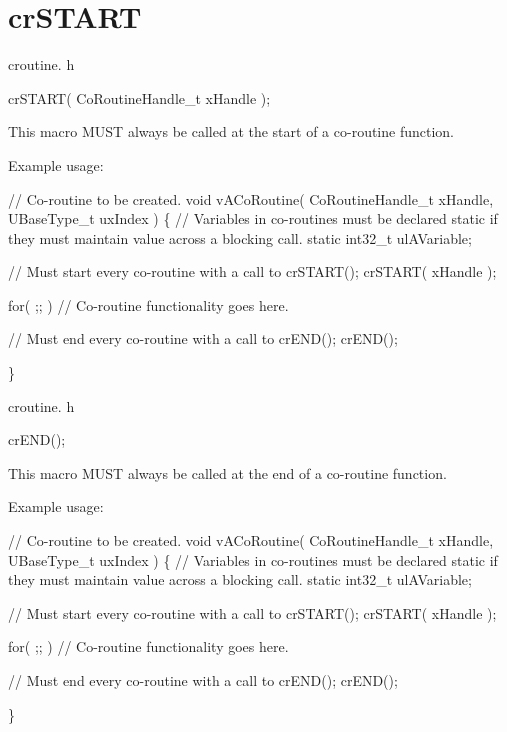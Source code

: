 \hypertarget{group__cr_s_t_a_r_t}{}\section{cr\+S\+T\+A\+RT}
\label{group__cr_s_t_a_r_t}
croutine. h 
\begin{DoxyPre}
crSTART( CoRoutineHandle\_t xHandle );\end{DoxyPre}


This macro M\+U\+ST always be called at the start of a co-\/routine function.

Example usage\+: 
\begin{DoxyPre}
// Co-routine to be created.
void vACoRoutine( CoRoutineHandle\_t xHandle, UBaseType\_t uxIndex )
\{
// Variables in co-routines must be declared static if they must maintain value across a blocking call.
static int32\_t ulAVariable;
\begin{DoxyVerb}// Must start every co-routine with a call to crSTART();
crSTART( xHandle );

for( ;; )
{
     // Co-routine functionality goes here.
}

// Must end every co-routine with a call to crEND();
crEND();
\end{DoxyVerb}

\}\end{DoxyPre}


croutine. h 
\begin{DoxyPre}
crEND();\end{DoxyPre}


This macro M\+U\+ST always be called at the end of a co-\/routine function.

Example usage\+: 
\begin{DoxyPre}
// Co-routine to be created.
void vACoRoutine( CoRoutineHandle\_t xHandle, UBaseType\_t uxIndex )
\{
// Variables in co-routines must be declared static if they must maintain value across a blocking call.
static int32\_t ulAVariable;
\begin{DoxyVerb}// Must start every co-routine with a call to crSTART();
crSTART( xHandle );

for( ;; )
{
     // Co-routine functionality goes here.
}

// Must end every co-routine with a call to crEND();
crEND();
\end{DoxyVerb}

\}\end{DoxyPre}
 